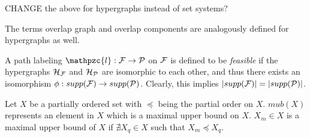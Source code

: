 \documentclass{llncs}
\def\cF{{\cal F}}
\def\cH{{\cal H}}
\def\cP{{\cal P}}
\def\F{{\mathcal F}}
\def\A{{\mathcal A}}
\def\cl{\mathpzc{l}}
\def\cmt{7cm}
\begin{document}
\parbox{\cmt} 
{CHANGE the above for hypergraphs instead of set systems?\\}


The terms
overlap graph and overlap components are analogously defined for
hypergraphs as well. 






\noindent
A path labeling $\cl: \cF \rightarrow \cP$ on $\cF$ is defined to be {\em
  feasible} if the hypergraphs $\cH_\cF$ and $\cH_\cP$ are isomorphic
to each other, and thus there exists an isomorphism $\phi: supp(\cF)
\rightarrow supp(\cP)$. Clearly, this implies $|supp(\cF)| = |supp(\cP)|$.



\noindent
Let $X$ be a partially ordered set with $\preccurlyeq$ being the
partial order on $X$.  $mub(X)$ represents an element in $X$ which is
a maximal upper bound on $X$.  $X_m \in X$ is a maximal upper bound of
$X$ if $\nexists X_q \in X$ such that $X_m
\preccurlyeq X_q$. \\

\end{document}
